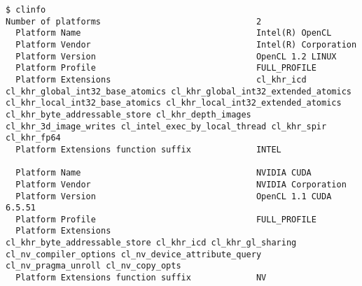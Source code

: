 \documentclass{article}
\begin{document}
  \begin{lstlisting}[language={}]
$ clinfo
Number of platforms                               2
  Platform Name                                   Intel(R) OpenCL
  Platform Vendor                                 Intel(R) Corporation
  Platform Version                                OpenCL 1.2 LINUX
  Platform Profile                                FULL_PROFILE
  Platform Extensions                             cl_khr_icd cl_khr_global_int32_base_atomics cl_khr_global_int32_extended_atomics cl_khr_local_int32_base_atomics cl_khr_local_int32_extended_atomics cl_khr_byte_addressable_store cl_khr_depth_images cl_khr_3d_image_writes cl_intel_exec_by_local_thread cl_khr_spir cl_khr_fp64 
  Platform Extensions function suffix             INTEL

  Platform Name                                   NVIDIA CUDA
  Platform Vendor                                 NVIDIA Corporation
  Platform Version                                OpenCL 1.1 CUDA 6.5.51
  Platform Profile                                FULL_PROFILE
  Platform Extensions                             cl_khr_byte_addressable_store cl_khr_icd cl_khr_gl_sharing cl_nv_compiler_options cl_nv_device_attribute_query cl_nv_pragma_unroll cl_nv_copy_opts 
  Platform Extensions function suffix             NV


\end{lstlisting}
\end{document}
